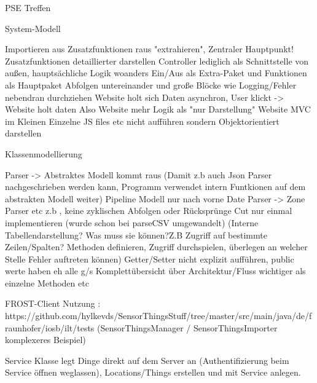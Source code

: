     PSE Treffen
    
    System-Modell
    
    Importieren aus Zusatzfunktionen raus "extrahieren", Zentraler Hauptpunkt!
    Zusatzfunktionen detaillierter darstellen
    Controller lediglich als Schnittstelle von außen, hauptsächliche Logik woanders
    Ein/Aus als Extra-Paket und Funktionen als Hauptpaket
    Abfolgen untereinander und große Blöcke wie Logging/Fehler nebendran durchziehen
    Website holt sich Daten asynchron, User klickt -> Website holt daten   Also Website mehr Logik als "nur Darstellung"
    Website MVC im Kleinen
    Einzelne JS files etc nicht aufführen sondern Objektorientiert darstellen
    
    Klassenmodellierung
    
    Parser -> Abstraktes Modell kommt raus   (Damit z.b auch Json Parser nachgeschrieben werden kann, Programm verwendet intern Funtkionen auf dem abstrakten Modell weiter)
    Pipeline Modell nur nach vorne Date Parser -> Zone Parser etc z.b , keine zyklischen Abfolgen oder Rücksprünge
    Cut nur einmal implementieren (wurde schon bei parseCSV umgewandelt)
    (Interne Tabellendarstellung? Was muss sie können?Z.B Zugriff auf bestimmte Zeilen/Spalten? Methoden definieren, Zugriff durchspielen, überlegen an welcher Stelle Fehler auftreten können)
    Getter/Setter nicht explizit aufführen, public werte haben eh alle g/s
    Komplettübersicht über Architektur/Fluss wichtiger als einzelne Methoden etc
    
    FROST-Client Nutzung : https://github.com/hylkevds/SensorThingsStuff/tree/master/src/main/java/de/fraunhofer/iosb/ilt/tests
    (SensorThingsManager / SensorThingsImporter komplexeres Beispiel)
    
    Service Klasse legt Dinge direkt auf dem Server an (Authentifizierung beim Service öffnen weglassen), Locations/Things erstellen und mit Service anlegen.
    
    
    
